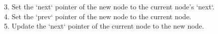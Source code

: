 \documentclass[preview]{standalone}
\begin{document}
3. Set the `next` pointer of the new node to the current node's `next`.\\4. Set the `prev` pointer of the new node to the current node.\\5. Update the `next` pointer of the current node to the new node.\\
\end{document}

